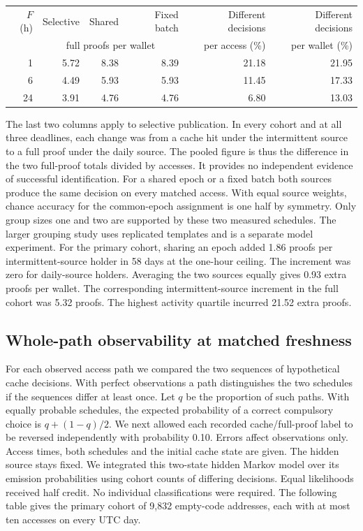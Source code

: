 \begin{center}
\small
\begin{tabular}{rrrrrr}
\hline
$F$ (h) & Selective & Shared & Fixed batch & Different decisions & Different decisions \\
 & \multicolumn{3}{c}{full proofs per wallet} & per access (\%) & per wallet (\%) \\
\hline
1 & 5.72 & 8.38 & 8.39 & 21.18 & 21.95 \\
6 & 4.49 & 5.93 & 5.93 & 11.45 & 17.33 \\
24 & 3.91 & 4.76 & 4.76 & 6.80 & 13.03 \\
\hline
\end{tabular}
\end{center}

The last two columns apply to selective publication. In every cohort and at all three deadlines, each change was from a cache hit under the intermittent source to a full proof under the daily source. The pooled figure is thus the difference in the two full-proof totals divided by accesses. It provides no independent evidence of successful identification. For a shared epoch or a fixed batch both sources produce the same decision on every matched access. With equal source weights, chance accuracy for the common-epoch assignment is one half by symmetry. Only group sizes one and two are supported by these two measured schedules. The larger grouping study uses replicated templates and is a separate model experiment. For the primary cohort, sharing an epoch added 1.86 proofs per intermittent-source holder in 58 days at the one-hour ceiling. The increment was zero for daily-source holders. Averaging the two sources equally gives 0.93 extra proofs per wallet. The corresponding intermittent-source increment in the full cohort was 5.32 proofs. The highest activity quartile incurred 21.52 extra proofs.

\subsection{Whole-path observability at matched freshness}

For each observed access path we compared the two sequences of hypothetical cache decisions. With perfect observations a path distinguishes the two schedules if the sequences differ at least once. Let $q$ be the proportion of such paths. With equally probable schedules, the expected probability of a correct compulsory choice is $q+(1-q)/2$. We next allowed each recorded cache/full-proof label to be reversed independently with probability 0.10. Errors affect observations only. Access times, both schedules and the initial cache state are given. The hidden source stays fixed. We integrated this two-state hidden Markov model over its emission probabilities using cohort counts of differing decisions. Equal likelihoods received half credit. No individual classifications were required. The following table gives the primary cohort of 9,832 empty-code addresses, each with at most ten accesses on every UTC day.

